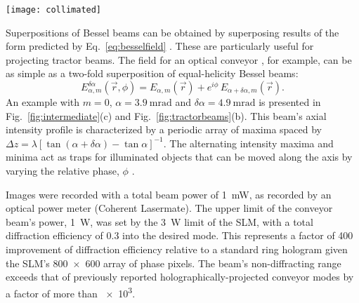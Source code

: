 \begin{figure*}[!t]
  \centering
  \texttt{[image: collimated]}
  \caption{Propagation-invariant modes projected with intermediate-plane
    holograms.  (a) Bessel beam, $m = 0$, $\alpha = \SI{3.9}{\milli\radian}$.
    (b) Optical conveyor,
    $m = 0$,
    $\alpha_1 = \SI{3.9}{\milli\radian}$,
    $\alpha_2 = \SI{8.8}{\milli\radian}$.
    (c) Solenoidal tractor beam,
    $m_1 = \num{-10}$,
    $m_2 = \num{-7}$,
    $\alpha_1 = \SI{6.4}{\milli\radian}$,
    $\alpha_2 = \SI{8.8}{\milli\radian}$.}
  \label{fig:tractorbeams}
\end{figure*}

Superpositions of Bessel beams can be obtained
by superposing results of the form predicted
by Eq.~\eqref{eq:besselfield} \cite{mcgloin03b}.
These are particularly useful for projecting
tractor beams.
The field for an optical conveyor
\cite{cizmar05,ruffner12a,ruffner14},
for example, can be as simple as a two-fold superposition
of equal-helicity Bessel beams:
\begin{equation}
  \label{eq:conveyorfield}
  E_{\alpha,m}^{\delta \alpha}(\vec{r},\phi)
  =
  E_{\alpha,m}(\vec{r})
  +
  e^{i \phi} \,
  E_{\alpha+\delta\alpha,m}(\vec{r}).
\end{equation}
An example with $m = 0$, $\alpha = \SI{3.9}{\milli\radian}$
and $\delta \alpha = \SI{4.9}{\milli\radian}$
is presented in Fig.~\ref{fig:intermediate}(c) and Fig.~\ref{fig:tractorbeams}(b).
This beam's axial intensity profile is characterized by
a periodic array of maxima spaced by
$\Delta z = \lambda [\tan (\alpha + \delta\alpha) - \tan
\alpha]^{-1}$.
The alternating intensity maxima and minima act as
traps for illuminated objects that can be moved
along the axis by
varying the relative phase, $\phi$
\cite{cizmar05,ruffner12a,ruffner14}.

Images were recorded with a total beam power of \SI{1}{\milli\watt},
as recorded by an optical power meter (Coherent Lasermate).
The upper limit of the conveyor beam's power, \SI{1}{\watt}, was
set by the \SI{3}{\watt} limit of the SLM, with a total diffraction
efficiency of \num{0.3} into the desired mode.
This represents a factor of \num{400} improvement of diffraction
efficiency relative to a standard ring hologram
\cite{ruffner12a,ruffner14}
given the SLM's \num{800 x 600} array of phase pixels.
The beam's non-diffracting range exceeds that of previously
reported holographically-projected conveyor modes
\cite{ruffner12a,ruffner14}
by a factor of more than \num{e3}.

